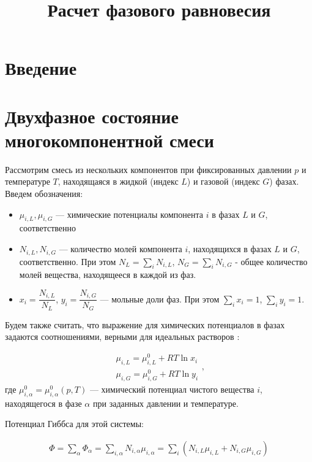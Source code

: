 \documentclass[12pt]{article}
\title{Расчет фазового равновесия}
\begin{document}
\maketitle

\section{Введение}

\section{Двухфазное состояние многокомпонентной смеси}
Рассмотрим смесь из нескольких компонентов при фиксированных давлении $p$ и температуре $T$, находящаяся в жидкой (индекс $L$) и газовой (индекс $G$) фазах. Введем обозначения:
\begin{itemize}
\item $\mu_{i,L}, \mu_{i,G}$ --- химические потенциалы компонента $i$ в фазах $L$ и $G$, соответственно
\item $N_{i,L}, N_{i,G}$ --- количество молей компонента $i$, находящихся в фазах $L$ и $G$, соответственно. При этом $N_L = \sum_i N_{i,L}$, $N_G = \sum_i N_{i,G}$ - общее количество молей вещества, находящееся в каждой из фаз.
\item $x_i = \dfrac{N_{i, L}}{N_L}$, $y_i = \dfrac{N_{i,G}}{N_G}$ --- мольные доли фаз. При этом $ \displaystyle \sum_i x_i = 1 $, $\displaystyle \sum_i y_i = 1 $.
\end{itemize}

Будем также считать, что выражение для химических потенциалов в фазах задаются соотношениями, верными для идеальных растворов \cite{Prigozhin}:

\begin{equation}
\begin{aligned}
\mu_{i,L} = \mu_{i,L}^0 + RT \ln x_i \\
\mu_{i,G} = \mu_{i,G}^0 + RT \ln y_i
\end{aligned},
\label{eq:hid}
\end{equation}
где $\mu_{i,\alpha}^0 = \mu_{i,\alpha}^0(p, T)$ --- химический потенциал чистого вещества $i$, находящегося в фазе $\alpha$ при заданных давлении и температуре.

Потенциал Гиббса для этой системы:

\begin{equation}
\begin{aligned}
\Phi = \sum_\alpha \Phi_\alpha = \sum_{i, \alpha}{N_{i,\alpha} \mu_{i,\alpha}} = \sum_i \left(N_{i, L} \mu_{i, L} + N_{i, G} \mu_{i, G}\right)
\end{aligned}
\label{eq:gibbs}
\end{equation}
\end{document}
